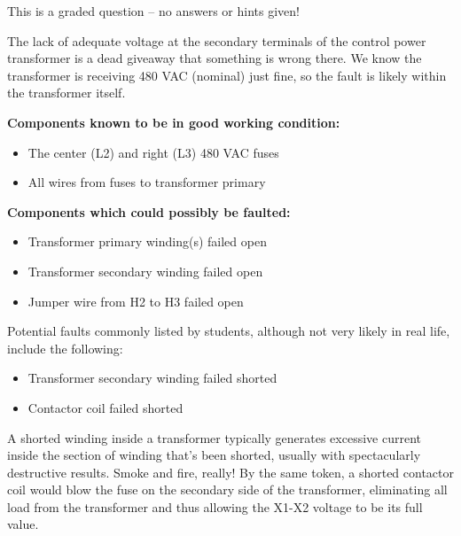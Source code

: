 \vfil 

\eject






This is a graded question -- no answers or hints given!







The lack of adequate voltage at the secondary terminals of the control power transformer is a dead giveaway that something is wrong there.  We know the transformer is receiving 480 VAC (nominal) just fine, so the fault is likely within the transformer itself.

\vskip 10pt

\noindent
{\bf Components known to be in good working condition:}

\begin{itemize}
\item{} The center (L2) and right (L3) 480 VAC fuses
\item{} All wires from fuses to transformer primary
\end{itemize}

\vskip 10pt

\goodbreak
\noindent
{\bf Components which could possibly be faulted:}

\begin{itemize}
\item{} Transformer primary winding(s) failed open
\item{} Transformer secondary winding failed open
\item{} Jumper wire from H2 to H3 failed open
\end{itemize}

\vskip 10pt

Potential faults commonly listed by students, although not very likely in real life, include the following:

\begin{itemize}
\item{} Transformer secondary winding failed shorted
\item{} Contactor coil failed shorted
\end{itemize}

A shorted winding inside a transformer typically generates excessive current inside the section of winding that's been shorted, usually with spectacularly destructive results.  Smoke and fire, really!  By the same token, a shorted contactor coil would blow the fuse on the secondary side of the transformer, eliminating all load from the transformer and thus allowing the X1-X2 voltage to be its full value.




